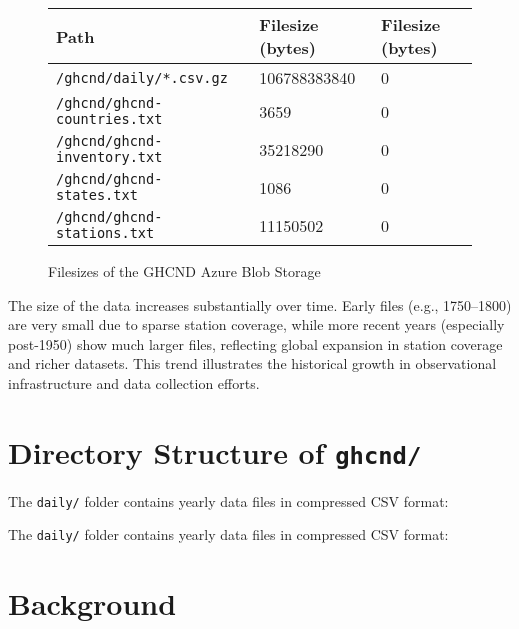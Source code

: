 \documentclass[11pt]{article}
\begin{document}
\begin{figure}[htbp]
    \centering
    \begin{minipage}{0.7\textwidth}
    \centering
    \begin{tabular}{@{}L{0.50\textwidth} R{0.25\textwidth} R{0.25\textwidth}@{}}
        \toprule
        \textbf{Path} & \textbf{Filesize (bytes)} & \textbf{Filesize (bytes)} \\
        \midrule
        \texttt{/ghcnd/daily/*.csv.gz}      & 106788383840 & 0\par \\
        \texttt{/ghcnd/ghcnd-countries.txt} &         3659 & 0\par \\
        \texttt{/ghcnd/ghcnd-inventory.txt} &     35218290 & 0\par \\
        \texttt{/ghcnd/ghcnd-states.txt}    &         1086 & 0\par \\
        \texttt{/ghcnd/ghcnd-stations.txt}  &     11150502 & 0\par \\
        \bottomrule
        \end{tabular}
\caption{Filesizes of the GHCND Azure Blob Storage}
\label{fig-azure-url}
\end{minipage}
\end{figure}
The size of the data increases substantially over time. Early files (e.g., 1750–1800) are very small due to sparse station coverage, while more recent years (especially post-1950) show much larger files, reflecting global expansion in station coverage and richer datasets. This trend illustrates the historical growth in observational infrastructure and data collection efforts.


\section*{Directory Structure of \texttt{ghcnd/}}

The \texttt{daily/} folder contains yearly data files in compressed CSV format:

\bigskip
\noindent The \texttt{daily/} folder contains yearly data files in compressed CSV format:


\section{Background}
\end{document}
